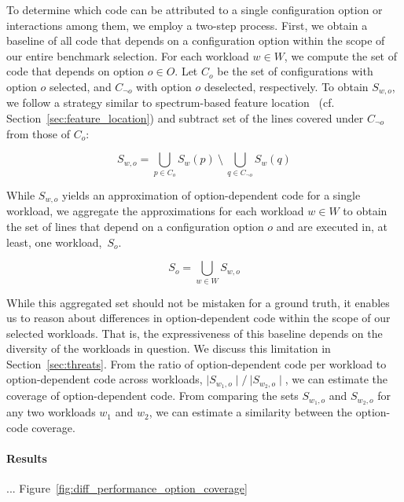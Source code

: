 To determine which code can be attributed to a single configuration option or interactions among them, we employ a two-step process. First, we obtain a baseline of all code that depends on a configuration option within the scope of our entire benchmark selection. For each workload $w \in W$, we compute the set of code that depends on option $o \in O$. Let $C_{o}$ be the set of configurations with option $o$ selected, and $C_{\neg o}$ with option $o$ deselected, respectively. To obtain $S_{w, o}$, we follow a strategy similar to spectrum-based feature location~\cite{michelon_spectrum_2021} (cf. Section~\ref{sec:feature_location}) and subtract set of the lines covered under $C_{\neg o}$ from those of $C_{o}$:

\begin{equation}
	S_{w, o} = \bigcup_{p \in C_{o}} S_{w}(p) ~ \setminus ~ \bigcup_{q \in C_{\neg o}} S_{w}(q)
\end{equation}

While $S_{w, o}$ yields an approximation of option-dependent code for a single workload, we aggregate the approximations for each workload $w \in W$ to obtain the set of lines that depend on a configuration option $o$ and are executed in, at least, one workload,~$S_{o}$. 

\begin{equation}
	S_{o} = \bigcup_{w \in W} S_{w, o}
\end{equation}

While this aggregated set should not be mistaken for a ground truth, it enables us to reason about differences in option-dependent code within the scope of our selected workloads. That is, the expressiveness of this baseline depends on the diversity of the workloads in question. We discuss this limitation in Section~\ref{sec:threats}. From the ratio of option-dependent code per workload to option-dependent code across workloads, $\mid S_{w_1, o}\mid/~{\mid S_{w_2, o}\mid}$, we can estimate the coverage of option-dependent code. From comparing the sets $S_{w_1, o}$ and $S_{w_2, o}$ for any two workloads $w_1$ and $w_2$, we can estimate a similarity between the option-code coverage.

\paragraph*{Results}{\color{blue} ... Figure~\ref{fig:diff_performance_option_coverage}}\\

